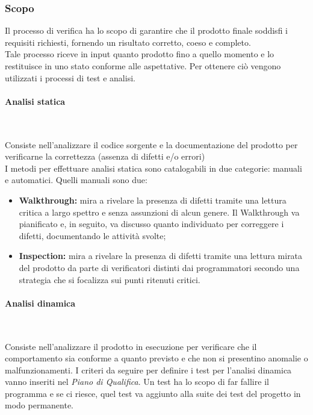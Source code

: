 \subsubsection{Scopo} 
Il processo di verifica ha lo scopo di garantire che il prodotto finale soddisfi i requisiti richiesti, fornendo un risultato corretto, coeso e completo.\\
Tale processo riceve in input quanto prodotto fino a quello momento e lo restituisce in uno stato conforme alle aspettative.
Per ottenere ciò vengono utilizzati i processi di test e analisi.
\paragraph{Analisi statica} ~

Consiste nell'analizzare il codice sorgente e la documentazione del prodotto per verificarne la correttezza (assenza di difetti e/o errori)\\
I metodi per effettuare analisi statica sono catalogabili in due categorie: manuali e automatici.
Quelli manuali sono due:
\begin{itemize}
    \item \textbf{Walkthrough:} mira a rivelare la presenza di difetti tramite una lettura critica a largo spettro e senza assunzioni di alcun genere. Il Walkthrough va pianificato e, in seguito, va discusso quanto individuato per correggere i difetti, documentando le attività svolte;
    \item \textbf{Inspection:} mira a rivelare la presenza di difetti tramite una lettura mirata del prodotto da parte di verificatori distinti dai programmatori secondo una strategia che si focalizza sui punti ritenuti critici. 
\end{itemize}

\paragraph{Analisi dinamica} ~

Consiste nell'analizzare il prodotto in esecuzione per verificare che il comportamento sia conforme a quanto previsto e che non si presentino anomalie o malfunzionamenti.
I criteri da seguire per definire i test per l'analisi dinamica vanno inseriti nel \textit{Piano di Qualifica}. Un test ha lo scopo di far fallire il programma e se ci riesce, quel test va aggiunto alla suite dei test del progetto in modo permanente.

